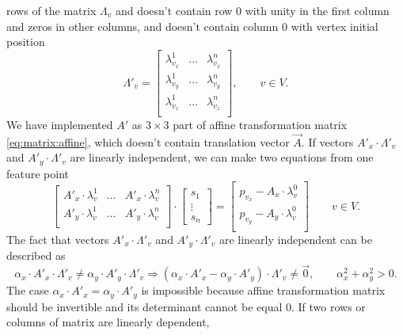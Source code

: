 rows of the matrix $\Lambda_v$ and doesn't contain row $0$
with unity in the first column and zeros in other columns,
and doesn't contain column $0$ with vertex initial position
\begin{equation*}
  \Lambda'_v = \begin{bmatrix}
    \lambda^1_{v_x} & \dots & \lambda^n_{v_x} \\
    \lambda^1_{v_y} & \dots & \lambda^n_{v_y} \\
    \lambda^1_{v_z} & \dots & \lambda^n_{v_z} \\
  \end{bmatrix},
  \qquad v \in V.
\end{equation*}
We have implemented $A'$ as $3 \times 3$ part of
affine transformation matrix \eqref{eq:matrix:affine},
which doesn't contain translation vector $\vec{A}$.
If vectors $A'_x \cdot \Lambda'_v$ and $A'_y \cdot \Lambda'_v$
are linearly independent,
we can make two equations from one feature point
\begin{equation*}
  \begin{bmatrix}
    A'_x \cdot \lambda^1_v & \dots & A'_x \cdot \lambda^n_v \\
    A'_y \cdot \lambda^1_v & \dots & A'_y \cdot \lambda^n_v \\
  \end{bmatrix}
  \cdot \begin{bmatrix}
    s_1 \\
    \vdots \\
    s_n
  \end{bmatrix}
  = \begin{bmatrix}
    p_{v_x} - A_x \cdot \lambda^0_v \\
    p_{v_y} - A_y \cdot \lambda^0_v \\
  \end{bmatrix}
  \qquad v \in V.
\end{equation*}
The fact that vectors $A'_x \cdot \Lambda'_v$ and $A'_y \cdot \Lambda'_v$
are linearly independent can be described as
\begin{equation*}
  \alpha_x \cdot A'_x \cdot \Lambda'_v
    \neq \alpha_y \cdot A'_y \cdot \Lambda'_v
  \Rightarrow
  \left( \alpha_x \cdot A'_x - \alpha_y \cdot A'_y \right) \cdot \Lambda'_v
    \neq \vec{0},
  \qquad \alpha_x^2 + \alpha_y^2 > 0.
\end{equation*}
The case $\alpha_x \cdot A'_x = \alpha_y \cdot A'_y$ is impossible
because affine transformation matrix should be invertible
and its determinant cannot be equal $0$.
If two rows or columns of matrix are linearly dependent,
